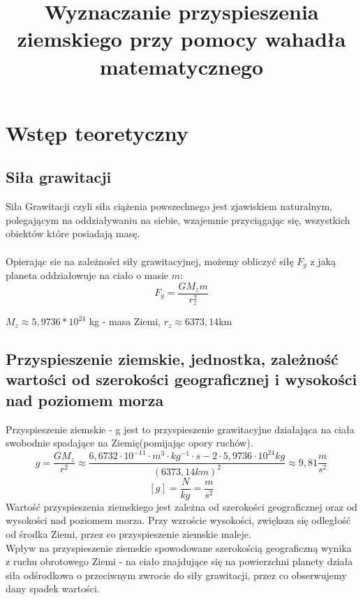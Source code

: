 \documentclass{article}
\begin{document}
\title{\huge\bfseries Wyznaczanie przyspieszenia ziemskiego przy pomocy wahadła matematycznego}
\date{}
\maketitle
\section{Wstęp teoretyczny}
\subsection{Siła grawitacji}
Siła Grawitacji czyli siła ciążenia powszechnego jest zjawiskiem naturalnym, polegającym na oddziaływaniu na siebie, wzajemnie przyciągając się,  wszystkich obiektów które posiadają masę.\\\\
	Opierając sie na zależności siły grawitacyjnej, możemy obliczyć siłę $F_g$ z jaką planeta oddziałowuje na ciało o masie $m$:
	$$F_g = \frac{GM_zm}{{r_z^2}}$$
	 \begin{center}
	 $M_z \approx 5,9736 * 10^{24}$ kg - masa Ziemi, $r_z \approx 6373,14$km
	 \end{center}
\subsection{Przyspieszenie ziemskie, jednostka, zależność wartości od szerokości geograficznej i wysokości nad poziomem morza}
Przyspieszenie ziemskie - g jest to przyspieszenie grawitacyjne działająca na ciała swobodnie spadające na Ziemię(pomijając opory ruchów). 
$$g = \frac{GM_z}{r^2} \approx \frac{6,6732 \cdot 10^{-11} \cdot m^3\cdot kg^{-1}\cdot s-2 \cdot 5,9736 \cdot 10^{24}kg}{(6373,14km)^2} \approx 9,81 \frac{m}{s^2}$$
$$[g] = \frac{N}{kg} = \frac{m}{s^2}$$
Wartość przyspieszenia ziemskiego jest zależna od szerokości geograficznej oraz od wysokości nad poziomem morza. Przy wzroście wysokości, zwiększa się odległość od środka Ziemi, przez co przyspieszenie ziemskie maleje.\\
Wpływ na przyspieszenie ziemskie spowodowane szerokością geograficzną wynika z ruchu obrotowego Ziemi - na ciało znajdujące się na powierzchni planety działa siła odśrodkowa o przeciwnym zwrocie do siły grawitacji, przez co obserwujemy dany spadek wartości.
\end{document}
